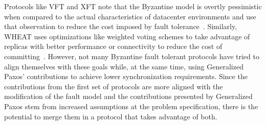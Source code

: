 Protocols like VFT and XFT note that the Byzantine model is overtly pessimistic when compared to the actual characteristics of datacenter environments and use that observation to reduce the cost imposed by fault tolerance~\cite{Porto2015,Liu2015}. Similarly, WHEAT uses optimizations like weighted voting schemes to take advantage of replicas with better performance or connectivity to reduce the cost of committing~\cite{Sousa2016}. However, not many Byzantine fault tolerant protocols have tried to align themselves with these goals while, at the same time, using Generalized Paxos' contributions to achieve lower synchronization requirements. Since the contributions from the first set of protocols are more aligned with the modification of the fault model and the contributions presented by Generalized Paxos stem from increased assumptions at the problem specification, there is the potential to merge them in a protocol that takes advantage of both. 


